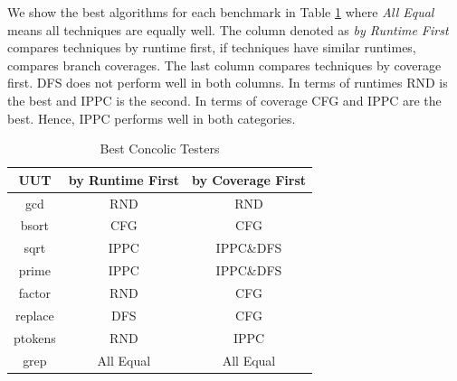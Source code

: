 \documentclass[EPiCempty]{easychair}
\begin{document}

We show the best algorithms for each benchmark in Table \ref{tbl:bestres} where \emph{All Equal} means all techniques are equally well. The column denoted as \emph{by Runtime First} compares techniques by runtime first, if techniques have similar runtimes, compares branch coverages. The last column compares techniques by coverage first. 
DFS does not perform well in both columns. In terms of runtimes RND is the best and IPPC is the second. In terms of coverage CFG and IPPC are the best.
Hence, IPPC performs well in both categories.


\begin{table}
\centering
\caption{Best Concolic Testers}
\vspace*{3pt}
\label{tbl:bestres}
\begin{tabular}{|c|cc|}
\hline
\textbf{UUT} & \textbf{by Runtime First} & \textbf{by Coverage First} \\
\hline
gcd & RND & RND \\
bsort & CFG & CFG \\
sqrt & IPPC & IPPC{\&}DFS \\
prime & IPPC & IPPC{\&}DFS \\
factor & RND & CFG \\
replace & DFS & CFG \\
ptokens & RND & IPPC \\
grep & All Equal & All Equal \\
\hline
\end{tabular}
\end{table}

\end{document}
